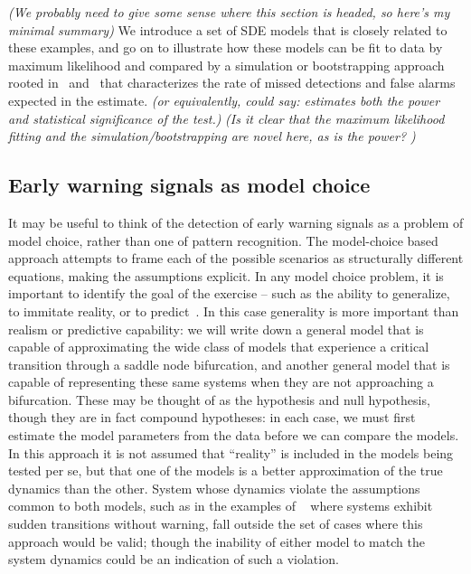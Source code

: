\documentclass[authoryear,preprint,11pt]{elsarticle}
\newcommand{\cb}[1]{{\it \color{darkgreen} (#1)}}
\begin{document}
\cb{We probably need to give some sense where this section is headed, so here's my minimal summary}
We introduce a set of SDE models that is closely related to these examples,
and go on to illustrate how these models can be fit to data by maximum likelihood
and compared by a simulation or bootstrapping approach rooted in~\citet{Cox1961} and~\citet{McLachlan1987} that
characterizes the rate of missed detections and false alarms expected in the estimate. 
\cb{or equivalently, could say: estimates both the power and statistical significance of the test.}  
\cb{Is it clear that the maximum likelihood fitting and the simulation/bootstrapping are novel here, as is the power? }



\subsection{Early warning signals as model choice}
It may be useful to think of the detection of early warning signals as a problem of model choice, rather than one of pattern recognition.  
The model-choice based approach attempts to frame each of the possible scenarios as structurally different equations,
making the assumptions explicit.  
In any model choice problem, it is important to identify the goal of the exercise -- such as the ability to generalize, to immitate reality, or to predict~\citep{Levins1966}.  
In this case generality is more important than realism or predictive capability: 
we will write down a general model that is capable of approximating the wide class of models that experience a critical transition through a saddle node bifurcation,
and another general model that is capable of representing these same systems when they are not approaching a bifurcation.  
These may be thought of as the hypothesis and null hypothesis,
though they are in fact compound hypotheses: in each case, we must first estimate the model parameters from the data before we can compare the models.  
In this approach it is not assumed that ``reality'' is included in the models being tested per se, 
but that one of the models is a better approximation of the true dynamics than the other.  
System whose dynamics violate the assumptions common to both models, 
such as in the examples of ~\citet{Hastings2009} where systems exhibit sudden transitions without warning, 
fall outside the set of cases where this approach would be valid; 
though the inability of either model to match the system dynamics could be an indication of such a violation.  
\end{document}
